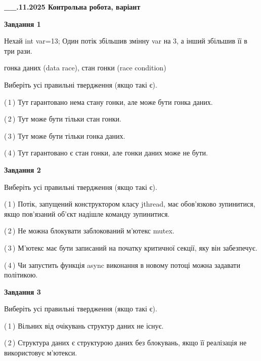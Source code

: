\documentclass[12pt, ukrainian]{article}
\begin{document}
\begin {large}

\textbf{\_\_.11.2025 Контрольна робота, варіант  }\par


{

\begin{center}
\textbf{Завдання 1}
\end{center}
Нехай int var=13; Один потік збільшив змінну var на 3, а інший збільшив її в три рази.

гонка даних (data race), стан гонки (race condition)

Виберіть усі правильні твердження (якщо такі є).\par
\vspace{2mm}
(\,1\,) Тут гарантовано нема стану гонки, але може бути гонка даних.%

(\,2\,) Тут може бути тільки стан гонки.%

(\,3\,) Тут може бути тільки гонка даних.%

(\,4\,) Тут гарантовано є стан гонки, але гонки даних може не бути.%



\begin{center}
\textbf{Завдання 2}
\end{center}
Виберіть усі правильні твердження (якщо такі є).\par
\vspace{2mm}

(\,1\,) Потік, запущений конструктором класу jthread, має обов’язково зупинитися, якщо пов’язаний об’єкт надішле команду зупинитися.%

(\,2\,) Не можна блокувати заблокований м’ютекс mutex.%

(\,3\,) М’ютекс має бути записаний на початку критичної секції, яку він забезпечує.%

(\,4\,) Чи запустить функція  async виконання в новому потоці можна задавати політикою.%



\begin{center}
\textbf{Завдання 3}
\end{center}
Виберіть усі правильні твердження (якщо такі є).\par
\vspace{2mm}

(\,1\,) Вільних від очікувань структур даних не існує.%

(\,2\,) Структура даних є структурою даних без блокувань, якщо її реалізація не використовує м’ютекси.%

}
\end{large}
\end{document}
